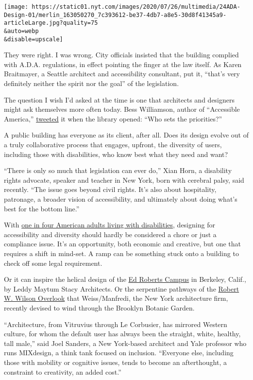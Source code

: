 \texttt{[image: https://static01.nyt.com/images/2020/07/26/multimedia/24ADA-Design-01/merlin\_163050270\_7c393612-be37-4db7-a8e5-30d8f41345a9-articleLarge.jpg?quality=75\\\&auto=webp\\\&disable=upscale]}

They were right. I was wrong. City officials insisted that the building
complied with A.D.A. regulations, in effect pointing the finger at the
law itself. As Karen Braitmayer, a Seattle architect and accessibility
consultant, put it, ``that's very definitely neither the spirit nor the
goal'' of the legislation.

The question I wish I'd asked at the time is one that architects and
designers might ask themselves more often today. Bess Williamson, author
of ``Accessible America,''
\href{https://twitter.com/besswww/status/1180128788065198080}{tweeted}
it when the library opened: ``Who sets the priorities?''

A public building has everyone as its client, after all. Does its design
evolve out of a truly collaborative process that engages, upfront, the
diversity of users, including those with disabilities, who know best
what they need and want?

``There is only so much that legislation can ever do,'' Xian Horn, a
disability rights advocate, speaker and teacher in New York, born with
cerebral palsy, said recently. ``The issue goes beyond civil rights.
It's also about hospitality, patronage, a broader vision of
accessibility, and ultimately about doing what's best for the bottom
line.''

With
\href{https://www.cdc.gov/ncbddd/disabilityandhealth/infographic-disability-impacts-all.html}{one
in four American adults living with disabilities}, designing for
accessibility and diversity should hardly be considered a chore or just
a compliance issue. It's an opportunity, both economic and creative, but
one that requires a shift in mind-set. A ramp can be something stuck
onto a building to check off some legal requirement.

Or it can inspire the helical design of the
\href{https://www.edrobertscampus.org/design/}{Ed Roberts Campus} in
Berkeley, Calif., by Leddy Maytum Stacy Architects. Or the serpentine
pathways of the
\href{http://www.weissmanfredi.com/project/brooklyn-botanic-garden-robert-w-wilson-overlook}{Robert
W. Wilson Overlook} that Weiss/Manfredi, the New York architecture firm,
recently devised to wind through the Brooklyn Botanic Garden.

``Architecture, from Vitruvius through Le Corbusier, has mirrored
Western culture, for whom the default user has always been the straight,
white, healthy, tall male,'' said Joel Sanders, a New York-based
architect and Yale professor who runs MIXdesign, a think tank focused on
inclusion. ``Everyone else, including those with mobility or cognitive
issues, tends to become an afterthought, a constraint to creativity, an
added cost.''

